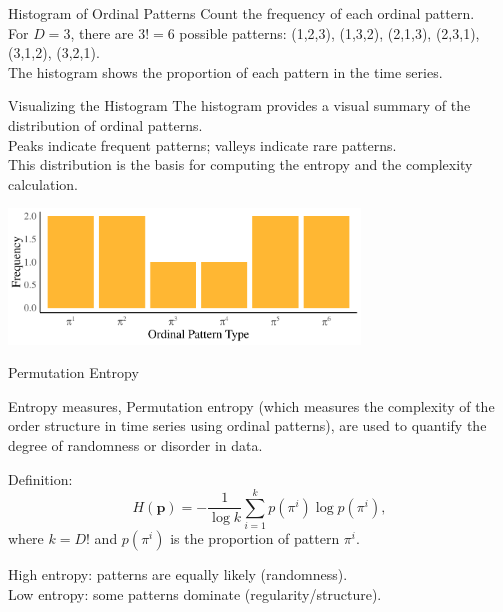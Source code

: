 \documentclass{beamer}
\begin{document}

\begin{frame}{Histogram of Ordinal Patterns}
	Count the frequency of each ordinal pattern.\\
	For $D=3$, there are $3!=6$ possible patterns: (1,2,3), (1,3,2), (2,1,3), (2,3,1), (3,1,2), (3,2,1).\\
	The histogram shows the proportion of each pattern in the time series.
\end{frame}

\begin{frame}{Visualizing the Histogram}
	The histogram provides a visual summary of the distribution of ordinal patterns.\\
	Peaks indicate frequent 
	patterns; valleys indicate rare patterns.\\
	This distribution is the basis for computing the entropy and the complexity 
	calculation.
		\begin{center}
		\includegraphics[width=0.7\textwidth]{frequency histogram}
	\end{center}
\end{frame}


\begin{frame}{Permutation Entropy}


	Entropy measures, %
	\alert{Permutation entropy} (which measures the complexity of the order structure in time series using ordinal patterns), are used to quantify the degree of randomness or disorder in data. 
	\begin{block}{Definition:}
		\[
		H(\mathbf{p}) = -\dfrac{1}{\log k} \sum_{i=1}^{k} p(\pi^i) \log p(\pi^i),
		\]
		where $k=D!$ and $p(\pi^i)$ is the proportion of pattern $\pi^i$.
	\end{block}
	High entropy: patterns are equally likely (randomness).\\
	Low entropy: some patterns dominate (regularity/structure).
\end{frame}
\end{document}
